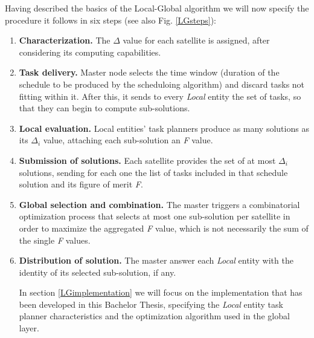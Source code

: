 Having described the basics of the Local-Global algorithm we will now specify the procedure it follows in six steps (see also Fig. \ref{LGsteps}):

\begin{enumerate}
\item \textbf{Characterization.} The $ \Delta $ value for each satellite is assigned, after considering its computing capabilities.
\item \textbf{Task delivery.} Master node selects the time window (duration of the schedule to be produced by the scheduloing algorithm) and discard tasks not fitting within it. After this, it sends to every \emph{Local} entity the set of tasks, so that they can begin to compute sub-solutions.
\item \textbf{Local evaluation.} Local entities' task planners produce as many solutions as its $ \Delta_i $ value, attaching each sub-solution an \emph{F} value.
\item \textbf{Submission of solutions.} Each satellite provides the set of at most $ \Delta_i $ solutions, sending for each one the list of tasks included in that schedule solution and its figure of merit \emph{F}.
\item \textbf{Global selection and combination.} The master triggers a combinatorial optimization process that selects at most one sub-solution per satellite in order to maximize the aggregated \emph{F} value, which is not necessarily the sum of the single \emph{F} values.
\item \textbf{Distribution of solution.} The master answer each \emph{Local} entity with the identity of its selected sub-solution, if any.

In section \ref{LGimplementation} we will focus on the implementation that has been developed in this Bachelor Thesis, specifying the \emph{Local} entity task planner characteristics and the optimization algorithm used in the global layer.
\end{enumerate}